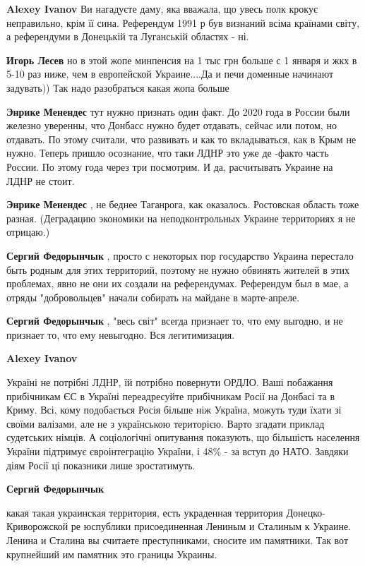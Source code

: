 \begin{itemize}
\begin{itemize}
\textbf{Alexey Ivanov} Ви нагадуєте даму, яка вважала, що увесь полк крокує неправильно, крім її сина. Референдум 1991 р був визнаний всіма країнами світу, а референдуми в Донецькій та Луганській областях - ні.

\textbf{Игорь Лесев} но в этой жопе минпенсия на 1 тыс грн больше с 1 января и жкх в 5-10 раз ниже, чем в европейской Украине....Да и печи доменные начинают задувать)) Так надо разобраться какая жопа больше

\textbf{Энрике Менендес} тут нужно признать один факт. До 2020 года в России
были железно уверенны, что Донбасс нужно будет отдавать, сейчас или потом, но
отдавать. По этому считали, что развивать и как то вкладываться, как в Крым не
нужно. Теперь пришло осознание, что таки ЛДНР это уже де -факто часть России.
По этому года через три посмотрим. И да, расчитывать Украине на ЛДНР не стоит.

\textbf{Энрике Менендес} , не беднее Таганрога, как оказалось. Ростовская область тоже разная.
(Деградацию экономики на неподконтрольных Украине территориях я не отрицаю.)

\textbf{Сергий Федорынчык} , просто с некоторых пор государство Украина перестало быть родным для этих территорий, поэтому не нужно обвинять жителей в этих проблемах, явно не они их создали на референдумах. Референдум был в мае, а отряды "добровольцев" начали собирать на майдане в марте-апреле.

\textbf{Сергий Федорынчык} , "весь світ" всегда признает то, что ему выгодно, и не признает то, что ему невыгодно. Вся легитимизация.

\textbf{Alexey Ivanov} 

Україні не потрібні ЛДНР, їй потрібно повернути ОРДЛО. Ваші побажання
прибічникам ЄС в Україні переадресуйте прибічникам Росії на Донбасі та в Криму.
Всі, кому подобається Росія більше ніж Україна, можуть туди їхати зі своїми
валізами, але не з українською територією. Варто згадати приклад судетських
німців. А соціологічні опитування показують, що більшість населення України
підтримує євроінтеграцію України, і 48\% - за вступ до НАТО. Завдяки діям Росії
ці показники лише зростатимуть.

\textbf{Сергий Федорынчык} 

какая такая украинская территория, есть украденная территория
Донецко-Криворожской ре юспублики присоединенная Лениным и Сталиным к Украине.
Ленина и Сталина вы считаете преступниками, сносите им памятники. Так вот
крупнейший им памятник это границы Украины.


\end{itemize}
\end{itemize}
